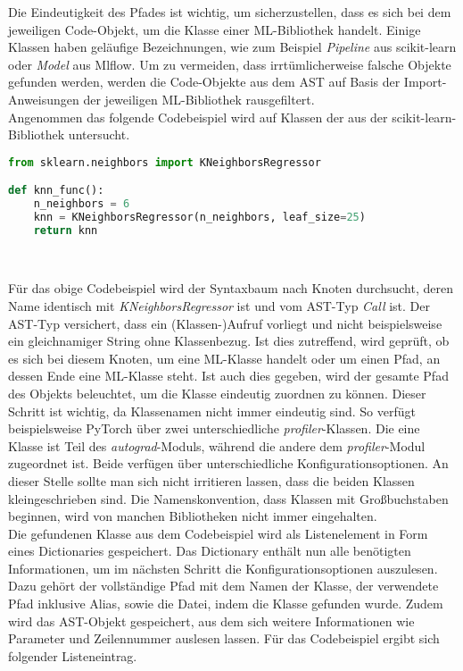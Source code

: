 \documentclass[german,bachelor]{swsLeipzig}
\begin{document}
Die Eindeutigkeit des Pfades ist wichtig, um sicherzustellen, dass es sich bei dem jeweiligen Code-Objekt, um die Klasse
einer ML-Bibliothek handelt.
Einige Klassen haben geläufige Bezeichnungen, wie zum Beispiel \textit{Pipeline} aus scikit-learn oder \textit{Model} aus Mlflow.
Um zu vermeiden, dass irrtümlicherweise falsche Objekte gefunden werden, werden die Code-Objekte aus dem AST auf Basis der
Import-Anweisungen der jeweiligen ML-Bibliothek rausgefiltert.\\

Angenommen das folgende Codebeispiel wird auf Klassen der aus der scikit-learn-Bibliothek untersucht.\\

\begin{lstlisting}[language=Python, frame=single, basicstyle=\small]
from sklearn.neighbors import KNeighborsRegressor

def knn_func():
    n_neighbors = 6
    knn = KNeighborsRegressor(n_neighbors, leaf_size=25)
    return knn
\end{lstlisting}
\

Für das obige Codebeispiel wird der Syntaxbaum nach Knoten durchsucht, deren Name identisch mit \textit{KNeighborsRegressor} ist und
vom AST-Typ \textit{Call} ist.
Der AST-Typ versichert, dass ein (Klassen-)Aufruf vorliegt und nicht beispielsweise ein gleichnamiger String ohne Klassenbezug.
Ist dies zutreffend, wird geprüft, ob es sich bei diesem Knoten, um eine ML-Klasse handelt oder um einen Pfad, an dessen Ende eine ML-Klasse steht.
Ist auch dies gegeben, wird der gesamte Pfad des Objekts beleuchtet, um die Klasse eindeutig zuordnen zu können.
Dieser Schritt ist wichtig, da Klassenamen nicht immer eindeutig sind.
So verfügt beispielsweise PyTorch über zwei unterschiedliche \textit{profiler}-Klassen.
Die eine Klasse ist Teil des \textit{autograd}-Moduls, während die andere dem \textit{profiler}-Modul zugeordnet ist.
Beide verfügen über unterschiedliche Konfigurationsoptionen.
An dieser Stelle sollte man sich nicht irritieren lassen, dass die beiden Klassen kleingeschrieben sind.
Die Namenskonvention, dass Klassen mit Großbuchstaben beginnen, wird von manchen Bibliotheken nicht immer eingehalten.\\

Die gefundenen Klasse aus dem Codebeispiel wird als Listenelement in Form eines Dictionaries gespeichert.
Das Dictionary enthält nun alle benötigten Informationen, um im nächsten Schritt
die Konfigurationsoptionen auszulesen.
Dazu gehört der vollständige Pfad mit dem Namen der Klasse, der verwendete Pfad inklusive Alias, sowie die Datei, indem
die Klasse gefunden wurde.
Zudem wird das AST-Objekt gespeichert, aus dem sich weitere Informationen wie Parameter und Zeilennummer auslesen lassen.
Für das Codebeispiel ergibt sich folgender Listeneintrag.\\
\end{document}
